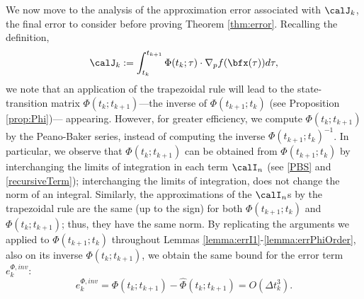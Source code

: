 \documentclass[DIV=12]{scrartcl} %
\newcommand{\err}{\ensuremath{e}}
\theoremstyle{definition}
\begin{document}
We now move to the analysis of the approximation error associated with $\calJ _k$, the final error to consider before proving Theorem \ref{thm:error}. Recalling the definition,
\[
    \calJ_k:=\int_{t_k}^{t_{k+1}}\Phi(t_k;\tau)\cdot \nabla_pf(\bfx(\tau))d\tau,
\]
we note that an application of the trapezoidal rule will lead to the state-transition matrix $\Phi(t_k;t_{k+1})$—the inverse of $\Phi(t_{k+1};t_k)$ (see Proposition \ref{prop:Phi})— appearing. However, for greater efficiency, we compute $\Phi(t_k;t_{k+1})$ by the Peano-Baker series, instead of computing the inverse $\Phi(t_{k+1};t_k)^{-1}$. In particular, we observe that $\Phi(t_k;t_{k+1})$ can be obtained from $\Phi(t_{k+1};t_k)$ by interchanging the limits of integration in each term $\calI_n$ (see \eqref{PBS} and \eqref{recursiveTerm}); interchanging the limits of integration, does not change the norm of an integral. Similarly, the approximations of the $\calI_n$s by the trapezoidal rule are the same (up to the sign) for both $\Phi(t_{k+1};t_k)$ and $\Phi(t_k;t_{k+1})$; thus, they have the same norm. By replicating the arguments we applied to $\Phi(t_{k+1};t_k)$ throughout Lemmas \ref{lemma:errI1}-\ref{lemma:errPhiOrder}, also on its inverse $\Phi(t_k;t_{k+1})$, we obtain the same bound for the error term $\err_k^{\Phi,inv}$:
\[
\err_k^{\Phi,inv}=\Phi(t_k;t_{k+1})-\hat{\Phi}(t_k;t_{k+1})=O(\Delta t_k^3).
\]
\end{document}
